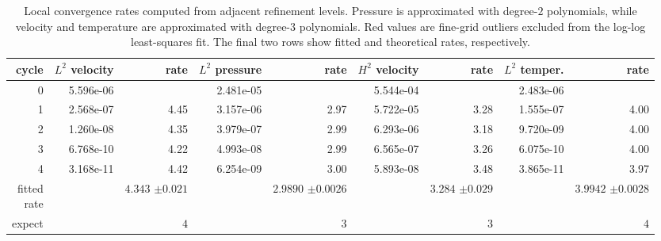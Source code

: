 \begin{table}[htbp]
\centering
\begin{tabular}{|r|r|r|r|r|r|r|r|r|}
\hline
cycle & \makecell{$L^{2}$\\velocity} & rate & \makecell{$L^{2}$\\pressure} & rate & \makecell{$H^{2}$\\velocity} & rate & \makecell{$L^{2}$\\temper.} & rate \\ \hline
0 & 5.596e-06 & \makecell{--} & 2.481e-05 & \makecell{--} & 5.544e-04 & \makecell{--} & 2.483e-06 & \makecell{--} \\ \hline
1 & 2.568e-07 & 4.45 & 3.157e-06 & 2.97 & 5.722e-05 & 3.28 & 1.555e-07 & 4.00 \\ \hline
2 & 1.260e-08 & 4.35 & 3.979e-07 & 2.99 & 6.293e-06 & 3.18 & 9.720e-09 & 4.00 \\ \hline
3 & 6.768e-10 & 4.22 & 4.993e-08 & 2.99 & 6.565e-07 & 3.26 & 6.075e-10 & 4.00 \\ \hline
4 & 3.168e-11 & 4.42 & 6.254e-09 & 3.00 & 5.893e-08 & 3.48 & 3.865e-11 & 3.97 \\ \hline
\makecell[r]{fitted\\rate} & \makecell{--} & \makecell[r]{$4.343 $\\$\pm  0.021$} & \makecell{--} & \makecell[r]{$2.9890 $\\$\pm  0.0026$} & \makecell{--} & \makecell[r]{$3.284 $\\$\pm  0.029$} & \makecell{--} & \makecell[r]{$3.9942 $\\$\pm  0.0028$} \\ \hline
expect & \makecell{--} & $4$ & \makecell{--} & $3$ & \makecell{--} & $3$ & \makecell{--} & $4$ \\ \hline
\end{tabular}
\caption{Local convergence rates computed from adjacent refinement levels. Pressure is approximated with degree-$2$ polynomials, while velocity and temperature are approximated with degree-$3$ polynomials. Red values are fine-grid outliers excluded from the log-log least-squares fit. The final two rows show fitted and theoretical rates, respectively.}
\end{table}
